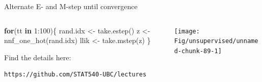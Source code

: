 \documentclass[
  ignorenonframetext,
  aspectratio=169]{beamer}
\newenvironment{Shaded}{\begin{snugshade}}{\end{snugshade}}
\newcommand{\ControlFlowTok}[1]{\textcolor[rgb]{0.13,0.29,0.53}{\textbf{#1}}}
\newcommand{\DecValTok}[1]{\textcolor[rgb]{0.00,0.00,0.81}{#1}}
\newcommand{\FunctionTok}[1]{\textcolor[rgb]{0.00,0.00,0.00}{#1}}
\newcommand{\NormalTok}[1]{#1}
\newcommand{\OtherTok}[1]{\textcolor[rgb]{0.56,0.35,0.01}{#1}}
\newcommand{\SpecialCharTok}[1]{\textcolor[rgb]{0.00,0.00,0.00}{#1}}
\begin{document}
\begin{frame}[fragile]{Alternate E- and M-step until convergence}
\protect\hypertarget{alternate-e--and-m-step-until-convergence}{}
\begin{columns}[T]
\begin{column}{.5\textwidth}
\large

\begin{Shaded}
\begin{Highlighting}[]
\ControlFlowTok{for}\NormalTok{(tt }\ControlFlowTok{in} \DecValTok{1}\SpecialCharTok{:}\DecValTok{100}\NormalTok{)\{}
\NormalTok{    rand.idx }\OtherTok{\textless{}{-}} \FunctionTok{take.estep}\NormalTok{()}
\NormalTok{    z }\OtherTok{\textless{}{-}} \FunctionTok{nnf\_one\_hot}\NormalTok{(rand.idx)}
\NormalTok{    llik }\OtherTok{\textless{}{-}} \FunctionTok{take.mstep}\NormalTok{(z)}
\NormalTok{\}}
\end{Highlighting}
\end{Shaded}

\normalsize

Find the details here:

\begin{verbatim}
https://github.com/STAT540-UBC/lectures
\end{verbatim}
\end{column}

\begin{column}{.5\textwidth}
\scriptsize

\begin{center}\texttt{[image: Fig/unsupervised/unnamed-chunk-89-1]} \end{center}

\normalsize
\end{column}
\end{columns}
\end{frame}
\end{document}
